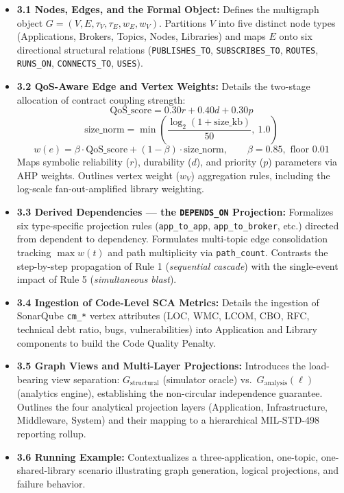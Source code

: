 \documentclass[review]{elsarticle}
\begin{document}
\begin{itemize}[leftmargin=*]
  \item \textbf{3.1 Nodes, Edges, and the Formal Object:} Defines the multigraph object $G = (V, E, \tau_V, \tau_E, w_E, w_V)$. Partitions $V$ into five distinct node types (Applications, Brokers, Topics, Nodes, Libraries) and maps $E$ onto six directional structural relations (\texttt{PUBLISHES\_TO}, \texttt{SUBSCRIBES\_TO}, \texttt{ROUTES}, \texttt{RUNS\_ON}, \texttt{CONNECTS\_TO}, \texttt{USES}).
  \item \textbf{3.2 QoS-Aware Edge and Vertex Weights:} Details the two-stage allocation of contract coupling strength:
    $$\text{QoS\_score} = 0.30r + 0.40d + 0.30p$$
    $$\text{size\_norm} = \min\!\left(\frac{\log_2(1 + \text{size\_kb})}{50},\ 1.0\right)$$
    $$w(e) = \beta\cdot\text{QoS\_score} + (1-\beta)\cdot\text{size\_norm}, \qquad \beta = 0.85, \text{ floor } 0.01$$
    Maps symbolic reliability ($r$), durability ($d$), and priority ($p$) parameters via AHP weights. Outlines vertex weight ($w_V$) aggregation rules, including the log-scale fan-out-amplified library weighting.
  \item \textbf{3.3 Derived Dependencies --- the \texttt{DEPENDS\_ON} Projection:} Formalizes six type-specific projection rules (\texttt{app\_to\_app}, \texttt{app\_to\_broker}, etc.) directed from dependent to dependency. Formulates multi-topic edge consolidation tracking $\max w(t)$ and path multiplicity via \texttt{path\_count}. Contrasts the step-by-step propagation of Rule 1 (\emph{sequential cascade}) with the single-event impact of Rule 5 (\emph{simultaneous blast}).
  \item \textbf{3.4 Ingestion of Code-Level SCA Metrics:} Details the ingestion of SonarQube \texttt{cm\_*} vertex attributes (LOC, WMC, LCOM, CBO, RFC, technical debt ratio, bugs, vulnerabilities) into Application and Library components to build the Code Quality Penalty.
  \item \textbf{3.5 Graph Views and Multi-Layer Projections:} Introduces the load-bearing view separation: $G_{\text{structural}}$ (simulator oracle) vs.\ $G_{\text{analysis}}(\ell)$ (analytics engine), establishing the non-circular independence guarantee. Outlines the four analytical projection layers (Application, Infrastructure, Middleware, System) and their mapping to a hierarchical MIL-STD-498 reporting rollup.
  \item \textbf{3.6 Running Example:} Contextualizes a three-application, one-topic, one-shared-library scenario illustrating graph generation, logical projections, and failure behavior.
\end{itemize}
\end{document}
